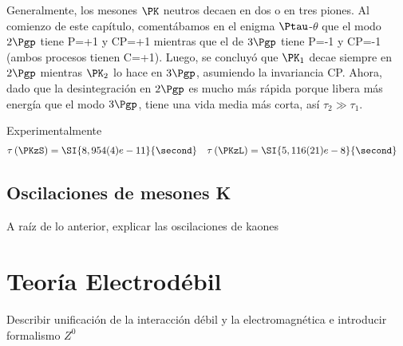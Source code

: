 Generalmente, los mesones $\PK$ neutros decaen en dos o en tres piones. Al comienzo de este capítulo, comentábamos en el enigma $\Ptau$-$\theta$ que el modo $2\Pgp$ tiene P=+1 y CP=+1 mientras que el de $3\Pgp$ tiene P=-1 y CP=-1 (ambos procesos tienen C=+1). Luego, se concluyó que $\PK_{1}$ decae siempre en $2\Pgp$ mientras $\PK_{2}$ lo hace en $3\Pgp$, asumiendo la invariancia CP. Ahora, dado que la desintegración en $2\Pgp$ es mucho más rápida porque libera más energía que el modo $3\Pgp$, tiene una vida media más corta, así $\tau_{2} \gg \tau_{1}$. 

Experimentalmente \cite{Zyla}
\begin{align}
\tau\left(\PKzS\right) &= \SI{8,954(4)e-11}{\second} & \tau\left(\PKzL\right) &= \SI{5,116(21)e-8}{\second}
\end{align}

\subsection{Oscilaciones de mesones K}\label{sec:kaon_oscillations}

A raíz de lo anterior, explicar las oscilaciones de kaones

\section{Teoría Electrodébil}\label{sec:electroweak}
Describir unificación de la interacción débil y la electromagnética
e introducir formalismo $Z^0$
